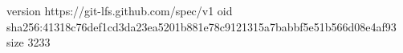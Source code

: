 version https://git-lfs.github.com/spec/v1
oid sha256:41318c76def1cd3da23ea5201b881e78c9121315a7babbf5e51b566d08e4af93
size 3233
